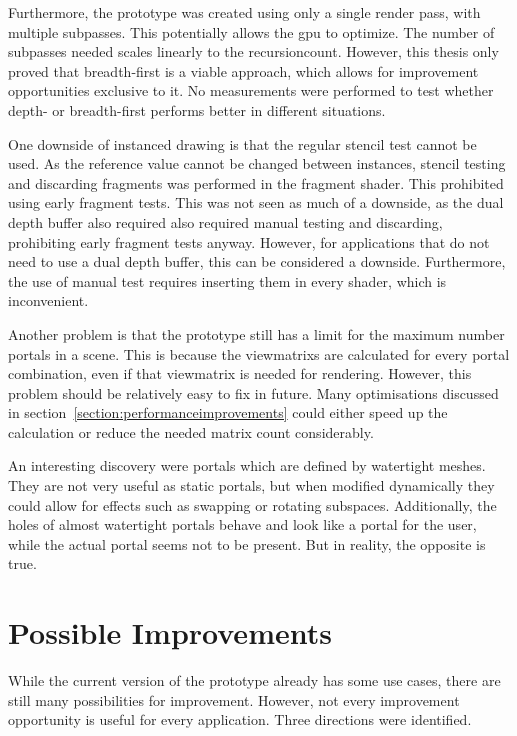 Furthermore, the prototype was created using only a single render pass, with multiple subpasses. This potentially allows the \gls{gpu} to optimize. The number of subpasses needed scales linearly to the \gls{recursioncount}. However, this thesis only proved that breadth-first is a viable approach, which allows for improvement opportunities exclusive to it. No measurements were performed to test whether depth- or breadth-first performs better in different situations.

One downside of instanced drawing is that the regular stencil test cannot be used. As the reference value cannot be changed between instances, stencil testing and discarding fragments was performed in the fragment shader. This prohibited using early fragment tests. This was not seen as much of a downside, as the dual depth buffer also required also required manual testing and discarding, prohibiting early fragment tests anyway. However, for applications that do not need to use a dual depth buffer, this can be considered a downside. Furthermore, the use of manual test requires inserting them in every shader, which is inconvenient.

Another problem is that the prototype still has a limit for the maximum  number portals in a scene. This is because the \glspl{viewmatrix} are calculated for every portal combination, even if that \gls{viewmatrix} is needed for rendering. However, this problem should be relatively easy to fix in future. Many optimisations discussed in section~\ref{section:performanceimprovements} could either speed up the calculation or reduce the needed matrix count considerably.

An interesting discovery were portals which are defined by watertight meshes. They are not very useful as static portals, but when modified dynamically they could allow for effects such as swapping or rotating subspaces. Additionally, the holes of almost watertight portals behave and look like a portal for the user, while the actual portal seems not to be present. But in reality, the opposite is true.


\section{Possible Improvements}

While the current version of the prototype already has some use cases, there are still many possibilities for improvement. However, not every improvement opportunity is useful for every application. Three directions were identified.

